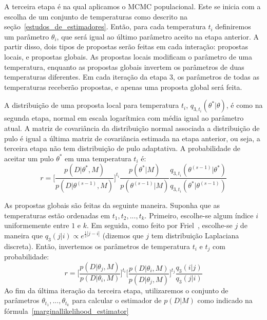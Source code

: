 \documentclass[12pt]{article}
\begin{document}
A terceira etapa é na qual aplicamos o MCMC populacional. Este se inicia 
com a escolha de um conjunto de temperaturas como descrito na 
seção~\ref{estudos_de_estimadores}. Então, para cada temperatura $t_i$ 
definiremos um parâmetro $\theta_i$, que será igual ao último parâmetro
aceito na etapa anterior. A partir disso, dois tipos de propostas serão 
feitas em cada interação: propostas locais, e propostas globais. As 
propostas locais modificam o parâmetro de uma temperatura, enquanto as 
propostas globais invertem os parâmetros de duas temperaturas 
diferentes. Em cada iteração da etapa 3, os parâmetros de todas as 
temperaturas receberão propostas, e apenas uma proposta global será 
feita.

A distribuição de uma proposta local para temperatura $t_i$,
$q_{3, t_i} (\theta^* | \theta)$, é  como na segunda etapa, normal em 
escala logarítmica com média igual ao parâmetro atual. A matriz de 
covariância da distribuição normal associada a distribuição de pulo é 
igual a última matriz de covariância estimada na etapa anterior, ou 
seja, a terceira etapa não tem distribuição de pulo adaptativa. A 
probabilidade de aceitar um pulo $\theta^*$ em uma temperatura $t_i$ é:
\begin{equation}\label{accepting_ratio_third_step}
    r = \bigg[\frac{p (D | \theta^*, M)}{p (D | \theta^{(s - 1)}, M)}\bigg]^{t_i}
        \frac{p (\theta^* | M)}{p(\theta^{(s - 1)} | M)}
        \frac{q_{3, t_i} (\theta^{(s - 1)} | \theta^*)}{q_{3, t_i} (\theta^* | \theta^{(s - 1)})}
\end{equation}

As propostas globais são feitas da seguinte maneira. Suponha que as
temperaturas estão ordenadas em $t_1, t_2, ..., t_k$. Primeiro, 
escolhe-se algum índice $i$ uniformemente entre $1$ e $k$. Em seguida,
como feito por Friel~\cite{Friel2008}, escolhe-se $j$ de maneira que 
$q_3 (j | i) \propto e^{\frac{1}{2}|j - i|}$ (dizemos que $j$ tem 
distribuição Laplaciana discreta). Então, invertemos os 
parâmetros de temperatura $t_i$ e $t_j$ com probabilidade:
\begin{equation}
    r = \bigg[\frac{p (D | \theta_j, M)}{p (D | \theta_i, M)}\bigg]^{t_i}
        \bigg[\frac{p (D | \theta_i, M)}{p (D | \theta_j, M)}\bigg]^{t_j}
        \frac{q_3 (i | j)}{q_3 (j | i)}
\end{equation}
Ao fim da última iteração da terceira etapa, utilizaremos o conjunto de 
parâmetros $\theta_{t_1}, ..., \theta_{t_k}$ para calcular o estimador
de $p (D | M)$ como indicado na 
fórmula~\ref{marginallikelihood_estimator}
\end{document}

